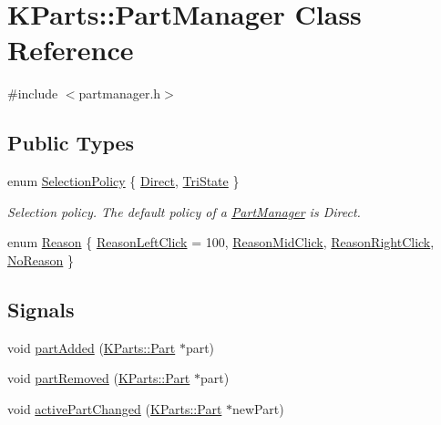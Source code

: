 \hypertarget{classKParts_1_1PartManager}{\section{\-K\-Parts\-:\-:\-Part\-Manager \-Class \-Reference}
\label{classKParts_1_1PartManager}
}


{\ttfamily \#include $<$partmanager.\-h$>$}

\subsection*{\-Public \-Types}
\begin{DoxyCompactItemize}
\item 
enum \hyperlink{classKParts_1_1PartManager_a7db25fb7e7f91548fa15566b3af4bb34}{\-Selection\-Policy} \{ \hyperlink{classKParts_1_1PartManager_a7db25fb7e7f91548fa15566b3af4bb34a79efb88f687be8f2b3aac8df408f837e}{\-Direct}, 
\hyperlink{classKParts_1_1PartManager_a7db25fb7e7f91548fa15566b3af4bb34aa481c1128a4e5df7d28446725af88482}{\-Tri\-State}
 \}
\begin{DoxyCompactList}\small\item\em \-Selection policy. \-The default policy of a \hyperlink{classKParts_1_1PartManager}{\-Part\-Manager} is \-Direct. \end{DoxyCompactList}\item 
enum \hyperlink{classKParts_1_1PartManager_a2210acbbe8638df29b112c48e4d9cfb3}{\-Reason} \{ \hyperlink{classKParts_1_1PartManager_a2210acbbe8638df29b112c48e4d9cfb3a6674110c2c4c77f14b4b1f3f05007930}{\-Reason\-Left\-Click} =  100, 
\hyperlink{classKParts_1_1PartManager_a2210acbbe8638df29b112c48e4d9cfb3a994f0fd06068a24c988a111ce920c58a}{\-Reason\-Mid\-Click}, 
\hyperlink{classKParts_1_1PartManager_a2210acbbe8638df29b112c48e4d9cfb3a3033a1660a6aaf18dbf6c945d9b0bbaf}{\-Reason\-Right\-Click}, 
\hyperlink{classKParts_1_1PartManager_a2210acbbe8638df29b112c48e4d9cfb3ae3a0e71725462dd7c5f6b63d26bddfe9}{\-No\-Reason}
 \}
\end{DoxyCompactItemize}
\subsection*{\-Signals}
\begin{DoxyCompactItemize}
\item 
void \hyperlink{classKParts_1_1PartManager_a0ddd1f334b7c397dcb2b11b418604a3f}{part\-Added} (\hyperlink{classKParts_1_1Part}{\-K\-Parts\-::\-Part} $\ast$part)
\item 
void \hyperlink{classKParts_1_1PartManager_afacc58788662a9e2eb73cc9418d442d8}{part\-Removed} (\hyperlink{classKParts_1_1Part}{\-K\-Parts\-::\-Part} $\ast$part)
\item 
void \hyperlink{classKParts_1_1PartManager_a9142dcbea26a78a91d4075a223594e3d}{active\-Part\-Changed} (\hyperlink{classKParts_1_1Part}{\-K\-Parts\-::\-Part} $\ast$new\-Part)
\end{DoxyCompactItemize}
